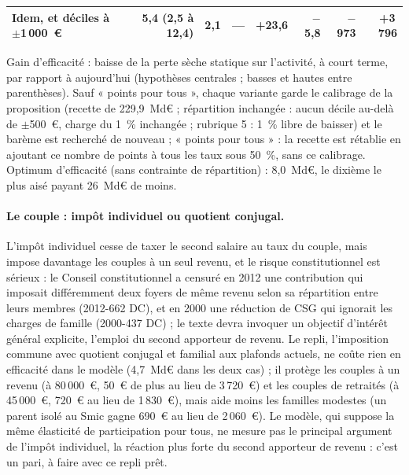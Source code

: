\documentclass[11pt,a4paper]{article}
\begin{document}
\begin{table}[!htbp]
{\begin{tabular}{@{}lrrrrrrr@{}}
\quad Idem, et déciles à $\pm$1\,000~€ & 5,4 (2,5 à 12,4) & 2,1 & --- & +23,6 & $-$5,8 & $-$973 & +3\,796 \\
\bottomrule
\end{tabular}}
\par\vspace{3pt}\parbox{\linewidth}{\raggedright\scriptsize\color{encre}
Gain d'efficacité : baisse de la perte sèche statique sur l'activité, à court terme, par rapport à aujourd'hui (hypothèses centrales ; basses et hautes entre parenthèses). Sauf « points pour tous », chaque variante garde le calibrage de la proposition (recette de 229,9~Md€ ; répartition inchangée : aucun décile au-delà de $\pm$500~€, charge du 1~\% inchangée ; rubrique 5 : 1~\% libre de baisser) et le barème est recherché de nouveau ; « points pour tous » : la recette est rétablie en ajoutant ce nombre de points à tous les taux sous 50~\%, sans ce calibrage. Optimum d'efficacité (sans contrainte de répartition) : 8,0~Md€, le dixième le plus aisé payant 26~Md€ de moins.}
\end{table}


\paragraph{Le couple : impôt individuel ou quotient conjugal.} L'impôt individuel cesse de taxer le second salaire au
taux du couple, mais impose davantage les couples à un seul revenu, et le risque constitutionnel est sérieux : le
Conseil constitutionnel a censuré en 2012 une contribution qui imposait différemment deux foyers de même revenu selon sa
répartition entre leurs membres (2012-662 DC), et en 2000 une réduction de CSG qui ignorait les charges de famille
(2000-437 DC) ; le texte devra invoquer un objectif d'intérêt général explicite, l'emploi du second apporteur de revenu.
Le repli, l'imposition commune avec quotient conjugal et familial aux plafonds actuels, ne coûte rien en efficacité dans
le modèle (4,7~Md€ dans les deux cas) ; il protège les couples à un revenu (à 80\,000~€, 50~€ de plus au lieu de
3\,720~€) et les couples de retraités (à 45\,000~€, 720~€ au lieu de 1\,830~€), mais aide moins les familles modestes
(un parent isolé au Smic gagne 690~€ au lieu de 2\,060~€). Le modèle, qui suppose la même élasticité de participation
pour tous, ne mesure pas le principal argument de l'impôt individuel, la réaction plus forte du second apporteur de
revenu : c'est un pari, à faire avec ce repli prêt.
\end{document}
